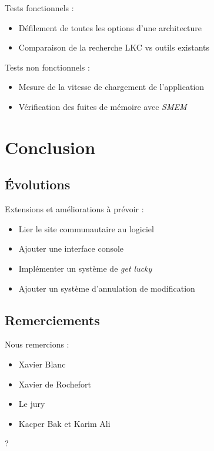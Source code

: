 \documentclass[11pt]{beamer}
\let\reallydohead\dohead
\newenvironment{nonavig}
               {\let\dohead\relax}
               {\let\dohead\reallydohead}
\begin{document}
\begin{frame}
    Tests fonctionnels :
    \begin{itemize}
    	\vspace{0.5cm}
        \setlength{\itemsep}{20pt}
        \item Défilement de toutes les options d'une architecture
        \item Comparaison de la recherche LKC vs outils existants
    \end{itemize}
\end{frame}

\begin{frame}
    Tests non fonctionnels :
    \begin{itemize}
    	\vspace{0.5cm}
        \setlength{\itemsep}{20pt}
        \item Mesure de la vitesse de chargement de l'application
        \item Vérification des fuites de mémoire avec \textit{SMEM}
    \end{itemize}
\end{frame}


\section{Conclusion}
\subsection{Évolutions}
\begin{frame}
    Extensions et améliorations à prévoir :
    \begin{itemize}
    	\vspace{0.5cm}
        \setlength{\itemsep}{20pt}
        \item Lier le site communautaire au logiciel
        \item Ajouter une interface console
        \item Implémenter un système de \textit{get lucky}
        \item Ajouter un système d'annulation de modification
    \end{itemize}
\end{frame}

\subsection{Remerciements}
\begin{frame}
    Nous remercions :
    \begin{itemize}
    	\vspace{0.5cm}
        \setlength{\itemsep}{20pt}
        \item Xavier Blanc
        \item Xavier de Rochefort
        \item Le jury
        \item Kacper Bak et Karim Ali
    \end{itemize}
\end{frame}

\begin{nonavig}
\begin{frame}
    \begin{center}
        {\fontsize{70}{60}\selectfont ?}
    \end{center}
\end{frame}
\end{nonavig}
\end{document}
